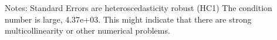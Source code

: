 Notes: \newline
 [1] Standard Errors are heteroscedasticity robust (HC1) \newline
 [2] The condition number is large, 4.37e+03. This might indicate that there are \newline
 strong multicollinearity or other numerical problems.